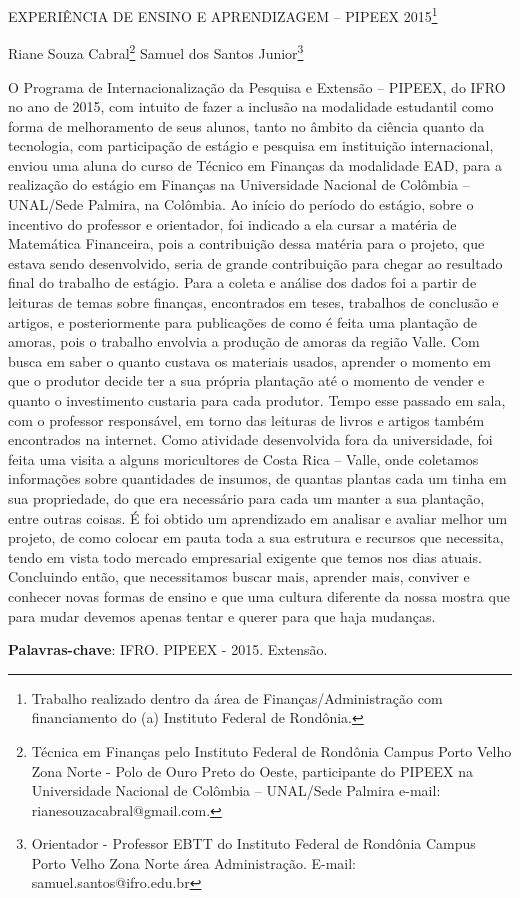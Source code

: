 \documentclass[article,12pt,onesidea,4paper,english,brazil]{abntex2}
\begin{document}
	
	
	\frenchspacing 
	
	\begin{center}
		\LARGE EXPERIÊNCIA DE ENSINO E APRENDIZAGEM – PIPEEX 2015\footnote{Trabalho realizado dentro da área de Finanças/Administração com financiamento do (a) Instituto Federal de Rondônia.}
		
		\normalsize
		Riane Souza Cabral\footnote{Técnica em Finanças pelo Instituto Federal de Rondônia Campus Porto Velho Zona Norte - Polo de Ouro Preto do Oeste, participante do PIPEEX na Universidade Nacional de Colômbia – UNAL/Sede Palmira e-mail: rianesouzacabral@gmail.com.} 
		Samuel dos Santos Junior\footnote{Orientador - Professor EBTT do Instituto Federal de Rondônia Campus Porto Velho Zona Norte área Administração. E-mail: samuel.santos@ifro.edu.br} 
	\end{center}
	
	\noindent O Programa de Internacionalização da Pesquisa e Extensão – PIPEEX, do IFRO no ano de 2015, com intuito de fazer a inclusão na modalidade estudantil como forma de melhoramento de seus alunos, tanto no âmbito da ciência quanto da tecnologia, com participação de estágio e pesquisa em instituição internacional, enviou uma aluna do curso de Técnico em Finanças da modalidade EAD, para a realização do estágio em Finanças na Universidade Nacional de Colômbia – UNAL/Sede Palmira, na Colômbia. Ao início do período do estágio, sobre o incentivo do professor e orientador, foi indicado a ela cursar a matéria de Matemática Financeira, pois a contribuição dessa matéria para o projeto, que estava sendo desenvolvido, seria de grande contribuição para chegar ao resultado final do trabalho de estágio. Para a coleta e análise dos dados foi a partir de leituras de temas sobre finanças, encontrados em teses, trabalhos de conclusão e artigos, e posteriormente para publicações de como é feita uma plantação de amoras, pois o trabalho envolvia a produção de amoras da região Valle. Com busca em saber o quanto custava os materiais usados, aprender o momento em que o produtor decide ter a sua própria plantação até o momento de vender e quanto o investimento custaria para cada produtor. Tempo esse passado em sala, com o professor responsável, em torno das leituras de livros e artigos também encontrados na internet. Como atividade desenvolvida fora da universidade, foi feita uma visita a alguns moricultores de Costa Rica – Valle, onde coletamos informações sobre quantidades de insumos, de quantas plantas cada um tinha em sua propriedade, do que era necessário para cada um manter a sua plantação, entre outras coisas. É foi obtido um aprendizado em analisar e avaliar melhor um projeto, de como colocar em pauta toda a sua estrutura e recursos que necessita, tendo em vista todo mercado empresarial exigente que temos nos dias atuais. Concluindo então, que necessitamos buscar mais, aprender mais, conviver e conhecer novas formas de ensino e que uma cultura diferente da nossa mostra que para mudar devemos apenas tentar e querer para que haja mudanças.
	
	\vspace{\onelineskip}
	
	\noindent
	\textbf{Palavras-chave}: IFRO. PIPEEX - 2015. Extensão.
	
\end{document}
